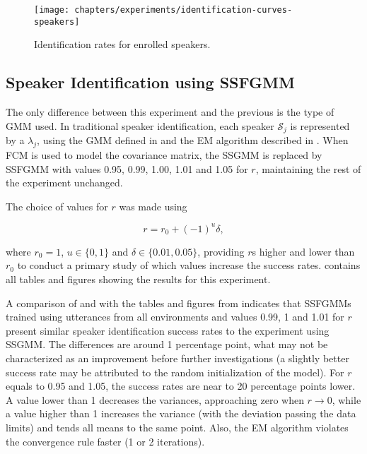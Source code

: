 \begin{figure}[ht]
    \centering
    \texttt{[image: chapters/experiments/identification-curves-speakers]}
    \caption{Identification rates for enrolled speakers.}
    \label{fig:identification-curves-speakers}
\end{figure}

\subsection{Speaker Identification using SSFGMM}

The only difference between this experiment and the previous is the type of GMM used. In traditional speaker identification, each speaker $\mathcal{S}_j$ is represented by a $\lambda_j$, using the GMM defined in  and the EM algorithm described in . When FCM is used to model the covariance matrix, the SSGMM is replaced by SSFGMM with values 0.95, 0.99, 1.00, 1.01 and 1.05 for $r$, maintaining the rest of the experiment unchanged.

The choice of values for $r$ was made using

\begin{equation}
    r = r_0 + (-1)^u\delta,
    \label{eq:choice-of-r}
\end{equation}

\noindent where $r_0 = 1$, $u \in \{0, 1\}$ and $\delta \in \{0.01, 0.05\}$, providing $r$s higher and lower than $r_0$ to conduct a primary study of which values increase the success rates.  contains all tables and figures showing the results for this experiment.

A comparison of  and  with the tables and figures from  indicates that SSFGMMs trained using utterances from all environments and values 0.99, 1 and 1.01 for $r$ present similar speaker identification success rates to the experiment using SSGMM. The differences are around 1 percentage point, what may not be characterized as an improvement before further investigations (a slightly better success rate may be attributed to the random initialization of the model). For $r$ equals to 0.95 and 1.05, the success rates are near to 20 percentage points lower. A value lower than 1 decreases the variances, approaching zero when $r \to 0$, while a value higher than 1 increases the variance (with the deviation passing the data limits) and tends all means to the same point. Also, the EM algorithm violates the convergence rule faster (1 or 2 iterations).

